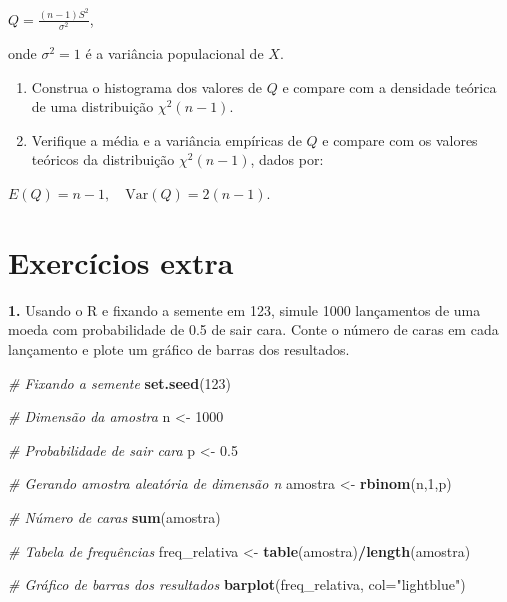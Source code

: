 \documentclass[
]{book}
\newenvironment{Shaded}{\begin{snugshade}}{\end{snugshade}}
\newcommand{\AttributeTok}[1]{\textcolor[rgb]{0.13,0.29,0.53}{#1}}
\newcommand{\CommentTok}[1]{\textcolor[rgb]{0.56,0.35,0.01}{\textit{#1}}}
\newcommand{\DecValTok}[1]{\textcolor[rgb]{0.00,0.00,0.81}{#1}}
\newcommand{\FloatTok}[1]{\textcolor[rgb]{0.00,0.00,0.81}{#1}}
\newcommand{\FunctionTok}[1]{\textcolor[rgb]{0.13,0.29,0.53}{\textbf{#1}}}
\newcommand{\NormalTok}[1]{#1}
\newcommand{\OtherTok}[1]{\textcolor[rgb]{0.56,0.35,0.01}{#1}}
\newcommand{\SpecialCharTok}[1]{\textcolor[rgb]{0.81,0.36,0.00}{\textbf{#1}}}
\newcommand{\StringTok}[1]{\textcolor[rgb]{0.31,0.60,0.02}{#1}}
\begin{document}
\(Q = \frac{(n-1) S^2}{\sigma^2}\),

onde \(\sigma^2 = 1\) é a variância populacional de \(X\).

\begin{enumerate}
\def\labelenumi{(\alph{enumi})}
\setcounter{enumi}{2}
\item
  Construa o histograma dos valores de \(Q\) e compare com a densidade teórica de uma distribuição \(\chi^2(n-1)\).
\item
  Verifique a média e a variância empíricas de \(Q\) e compare com os valores teóricos da distribuição \(\chi^2(n-1)\), dados por:
\end{enumerate}

\(E(Q) = n - 1, \quad \text{Var}(Q) = 2(n - 1)\).

\chapter{Exercícios extra}\label{exercuxedcios-extra}

\textbf{1.} Usando o R e fixando a semente em 123, simule 1000 lançamentos de
uma moeda com probabilidade de 0.5 de sair cara. Conte o número de caras
em cada lançamento e plote um gráfico de barras dos resultados.

\begin{Shaded}
\begin{Highlighting}[]
\CommentTok{\# Fixando a semente}
\FunctionTok{set.seed}\NormalTok{(}\DecValTok{123}\NormalTok{)}

\CommentTok{\# Dimensão da amostra}
\NormalTok{n }\OtherTok{\textless{}{-}} \DecValTok{1000}

\CommentTok{\# Probabilidade de sair cara}
\NormalTok{p }\OtherTok{\textless{}{-}} \FloatTok{0.5}

\CommentTok{\# Gerando amostra aleatória de dimensão n}
\NormalTok{amostra }\OtherTok{\textless{}{-}} \FunctionTok{rbinom}\NormalTok{(n,}\DecValTok{1}\NormalTok{,p)}

\CommentTok{\# Número de caras}
\FunctionTok{sum}\NormalTok{(amostra)}

\CommentTok{\# Tabela de frequências}
\NormalTok{freq\_relativa }\OtherTok{\textless{}{-}} \FunctionTok{table}\NormalTok{(amostra)}\SpecialCharTok{/}\FunctionTok{length}\NormalTok{(amostra)}

\CommentTok{\# Gráfico de barras dos resultados}
\FunctionTok{barplot}\NormalTok{(freq\_relativa, }\AttributeTok{col=}\StringTok{"lightblue"}\NormalTok{)}
\end{Highlighting}
\end{Shaded}
\end{document}
